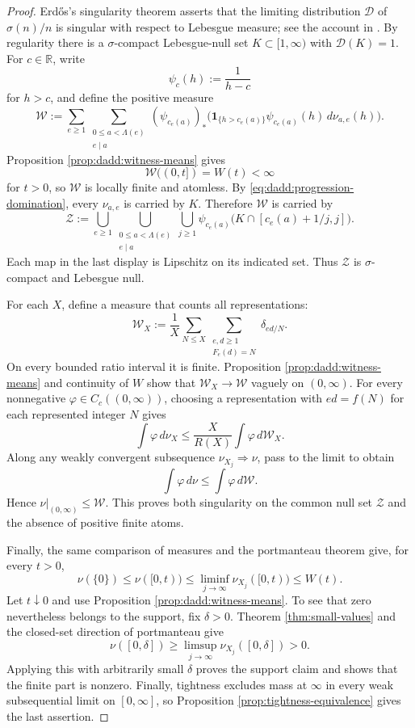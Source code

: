\documentclass[11pt,letterpaper,reqno]{amsart}
\numberwithin{equation}{section}
\theoremstyle{remark}
\newcommand{\R}{\mathbb{R}}
\renewcommand{\leq}{\leqslant}
\renewcommand{\geq}{\geqslant}
\begin{document}
\begin{proof}
Erd\H{o}s's singularity theorem asserts that the limiting distribution
$\mathcal{D}$ of $\sigma(n)/n$ is singular with respect to Lebesgue measure;
see the account in
\cite[p.~59]{ErdosDistribution}.
By regularity there is a $\sigma$-compact Lebesgue-null set
$K\subset[1,\infty)$ with $\mathcal{D}(K)=1$.
For $c\in\R$, write
\[
 \psi_c(h):=\frac{1}{h-c}
\]
for $h>c$, and define the positive measure
\[
 \mathcal{W}
 :=\sum_{e\geq1}
 \sum_{\substack{0\leq a<\Lambda(e)\\e\mid a}}
 (\psi_{c_e(a)})_*
 \bigl(\boldsymbol1_{\{h>c_e(a)\}}
 \psi_{c_e(a)}(h)\,d\nu_{a,e}(h)\bigr).
\]
Proposition \ref{prop:dadd:witness-means} gives
\[
 \mathcal{W}((0,t])=W(t)<\infty
\]
for $t>0$, so $\mathcal{W}$ is locally finite and atomless. By
\eqref{eq:dadd:progression-domination}, every $\nu_{a,e}$ is
carried by $K$. Therefore $\mathcal{W}$ is carried by
\[
 \mathcal{Z}
 :=\bigcup_{e\geq1}
 \bigcup_{\substack{0\leq a<\Lambda(e)\\e\mid a}}
 \bigcup_{j\geq1}
 \psi_{c_e(a)}
 \bigl(K\cap[c_e(a)+1/j,j]\bigr).
\]
Each map in the last display is Lipschitz on its indicated set.
Thus $\mathcal{Z}$ is $\sigma$-compact and Lebesgue null.

For each $X$, define a measure that counts all representations:
\[
 \mathcal{W}_X
 :=\frac1X\sum_{N\leq X}
 \sum_{\substack{e,d\geq1\\F_e(d)=N}}
 \delta_{ed/N}.
\]
On every bounded ratio interval it is finite. Proposition
\ref{prop:dadd:witness-means} and continuity of $W$ show that
$\mathcal{W}_X\to\mathcal{W}$ vaguely on $(0,\infty)$. For every
nonnegative $\varphi\in C_c((0,\infty))$, choosing a representation with $ed=f(N)$
for each represented integer $N$ gives
\[
 \int\varphi\,d\nu_X
 \leq\frac X{R(X)}\int\varphi\,d\mathcal{W}_X.
\]
Along any weakly convergent subsequence $\nu_{X_j}\Rightarrow\nu$,
pass to the limit to obtain
\[
 \int\varphi\,d\nu\leq\int\varphi\,d\mathcal{W}.
\]
Hence $\nu|_{(0,\infty)}\leq\mathcal{W}$. This proves both singularity
on the common null set $\mathcal{Z}$ and the absence of positive finite atoms.

Finally, the same comparison of measures and the portmanteau theorem give, for
every $t>0$,
\[
 \nu(\{0\})
 \leq\nu([0,t))
 \leq\liminf_{j\to\infty}\nu_{X_j}([0,t))
 \leq W(t).
\]
Let $t\downarrow0$ and use
Proposition \ref{prop:dadd:witness-means}. To see that zero nevertheless
belongs to the support, fix $\delta>0$. Theorem \ref{thm:small-values}
and the closed-set direction of portmanteau give
\[
 \nu([0,\delta])
 \geq\limsup_{j\to\infty}\nu_{X_j}([0,\delta])>0.
\]
Applying this with arbitrarily small $\delta$ proves the support claim
and shows that the finite part is nonzero. Finally, tightness excludes
mass at $\infty$ in every weak subsequential limit on $[0,\infty]$, so
Proposition \ref{prop:tightness-equivalence} gives the last assertion.
\end{proof}
\end{document}
